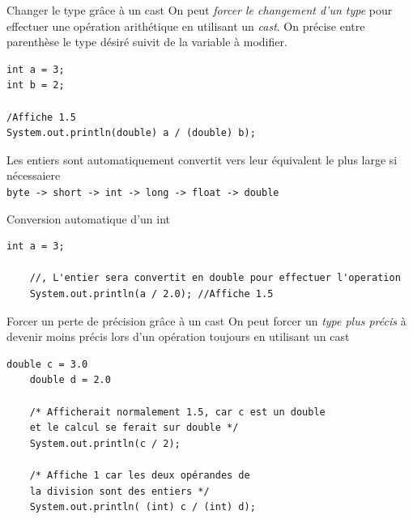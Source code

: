 \documentclass{report}
\begin{document}
\begin{Syntaxe*}{Changer le type grâce à un cast}{}
	On peut \textit{forcer le changement d'un type} pour effectuer une opération arithétique en utilisant un \textit{cast}. On précise entre parenthèse le type désiré suivit de la variable à modifier. 
\end{Syntaxe*}

\begin{EExample*}{}{}
\begin{lstlisting}[style=JavaDraculaWhite]
int a = 3;
int b = 2;

/Affiche 1.5
System.out.println(double) a / (double) b);
\end{lstlisting}
\end{EExample*}



\begin{note}
Les entiers sont automatiquement convertit vers leur équivalent le plus large si nécessaiere 
\\
\texttt{\footnotesize{byte -> short -> int -> long -> float -> double }}
\end{note}

\begin{EExample*}{Conversion automatique d'un int}{}
\begin{lstlisting}[style=JavaDraculaWhite]
	int a = 3;
	
	//, L'entier sera convertit en double pour effectuer l'operation 
	System.out.println(a / 2.0); //Affiche 1.5
\end{lstlisting}
\end{EExample*}

\begin{Syntaxe*}{Forcer un perte de précision grâce à un cast}{}
	On peut forcer un \textit{type plus précis} à devenir moins précis lors d'un opération toujours en utilisant un cast


\end{Syntaxe*}	
\begin{EExample*}{}{}
\begin{lstlisting}[style=JavaDraculaWhite]
	double c = 3.0
	double d = 2.0

	/* Afficherait normalement 1.5, car c est un double 
	et le calcul se ferait sur double */
	System.out.println(c / 2);

	/* Affiche 1 car les deux opérandes de 
	la division sont des entiers */
	System.out.println( (int) c / (int) d); 
\end{lstlisting}
\end{EExample*}
\end{document}

